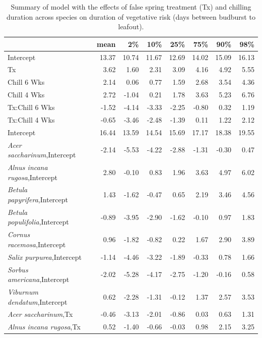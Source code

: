\documentclass{article}\usepackage[]{graphicx}\usepackage[]{color}
\begin{document}
\newpage
\begin{longtable}{lrrrrrrr}
\caption{Summary of model with the effects of false spring treatment (Tx) and chilling duration across species on duration of vegetative risk (days between budburst to leafout).} \\ 
  \hline
 & mean & 2\% & 10\% & 25\% & 75\% & 90\% & 98\% \\ 
  \hline \endhead  \hline
Intercept & 13.37 & 10.74 & 11.67 & 12.69 & 14.02 & 15.09 & 16.13 \\ 
  Tx & 3.62 & 1.60 & 2.31 & 3.09 & 4.16 & 4.92 & 5.55 \\ 
  Chill 6 Wks & 2.14 & 0.06 & 0.77 & 1.59 & 2.68 & 3.54 & 4.36 \\ 
  Chill 4 Wks & 2.72 & -1.04 & 0.21 & 1.78 & 3.63 & 5.23 & 6.76 \\ 
  Tx:Chill 6 Wks & -1.52 & -4.14 & -3.33 & -2.25 & -0.80 & 0.32 & 1.19 \\ 
  Tx:Chill 4 Wks & -0.65 & -3.46 & -2.48 & -1.39 & 0.11 & 1.22 & 2.12 \\ 
  Intercept & 16.44 & 13.59 & 14.54 & 15.69 & 17.17 & 18.38 & 19.55 \\ 
  \textit{Acer saccharinum},Intercept & -2.14 & -5.53 & -4.22 & -2.88 & -1.31 & -0.30 & 0.47 \\ 
  \textit{Alnus incana rugosa},Intercept & 2.80 & -0.10 & 0.83 & 1.96 & 3.63 & 4.97 & 6.02 \\ 
  \textit{Betula papyrifera},Intercept & 1.43 & -1.62 & -0.47 & 0.65 & 2.19 & 3.46 & 4.56 \\ 
  \textit{Betula populifolia},Intercept & -0.89 & -3.95 & -2.90 & -1.62 & -0.10 & 0.97 & 1.83 \\ 
  \textit{Cornus racemosa},Intercept & 0.96 & -1.82 & -0.82 & 0.22 & 1.67 & 2.90 & 3.89 \\ 
  \textit{Salix purpurea},Intercept & -1.14 & -4.46 & -3.22 & -1.89 & -0.33 & 0.78 & 1.66 \\ 
  \textit{Sorbus americana},Intercept & -2.02 & -5.28 & -4.17 & -2.75 & -1.20 & -0.16 & 0.58 \\ 
  \textit{Viburnum dendatum},Intercept & 0.62 & -2.28 & -1.31 & -0.12 & 1.37 & 2.57 & 3.53 \\ 
  \textit{Acer saccharinum},Tx & -0.46 & -3.13 & -2.01 & -0.86 & 0.03 & 0.63 & 1.31 \\ 
  \textit{Alnus incana rugosa},Tx & 0.52 & -1.40 & -0.66 & -0.03 & 0.98 & 2.15 & 3.25 \\ 

\end{longtable}
\end{document}

